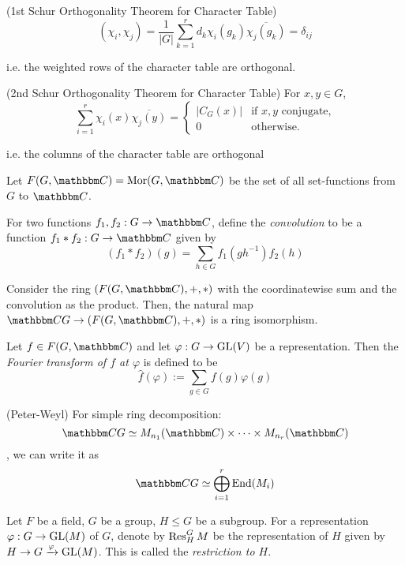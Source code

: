 \documentclass{article}
\begin{document}
\begin{theorem}(1st Schur Orthogonality Theorem for Character Table)
  \[(\chi_i, \chi_j) = \frac{1}{|G|} \sum_{k=1}^r d_k \chi_i(g_k) \overline{\chi_j(g_k)} = \delta_{ij}\]

  i.e. the weighted rows of the character table are orthogonal.
\end{theorem}

\begin{theorem}(2nd Schur Orthogonality Theorem for Character Table)
  For \(x, y \in G\),
  \[\sum_{i=1}^r \chi_i(x) \overline{\chi_j(y)} = \left\{\begin{array}{ll}
    |C_G(x)| & \text{if } x, y \text{ conjugate,} \\
    0 & \text{otherwise.}
  \end{array}\right.\]

  i.e. the columns of the character table are orthogonal
\end{theorem}

Let \(F(G, \bbC) = \Mor(G, \bbC)\) be the set of all set-functions from \(G\) to \(\bbC\).

\begin{definition}
  For two functions \(f_1, f_2: G \to \bbC\),
  define the \emph{convolution} to be a function \(f_1 * f_2: G \to \bbC\)
  given by
  \[(f_1 * f_2)(g) = \sum_{h \in G} f_1(gh^{-1}) f_2(h)\]
\end{definition}

\begin{corollary}
  Consider the ring \((F(G, \bbC), +, *)\)
  with the coordinatewise sum and the convolution as the product.
  Then, the natural map \(\bbC G \to (F(G, \bbC), +, *)\)
  is a ring isomorphism.
\end{corollary}

\begin{definition}
  Let \(f \in F(G, \bbC)\) and let \(\varphi: G \to \textnormal{GL}(V)\)
  be a representation.
  Then the \emph{Fourier transform of \(f\) at \(\varphi\)}
  is defined to be
  \[\widehat{f}(\varphi) := \sum_{g \in G} f(g) \varphi(g)\]
\end{definition}

\begin{theorem}(Peter-Weyl)
  For simple ring decomposition:
  \[\bbC G \simeq M_{n_1}(\bbC) \times \cdots \times M_{n_r}(\bbC)\],
  we can write it as
  \[\bbC G \simeq \bigoplus_{i=1}^r \End(M_i)\]
\end{theorem}

\begin{definition}
  Let \(F\) be a field, \(G\) be a group, \(H \le G\) be a subgroup.
  For a representation \(\varphi: G \to \textnormal{GL}(M)\) of \(G\),
  denote by \(\operatorname{Res}_H^G M\) be the representation of \(H\)
  given by \(H \to G \xrightarrow{\varphi} \textnormal{GL}(M)\).
  This is called the \emph{restriction to \(H\)}.
\end{definition}
\end{document}
